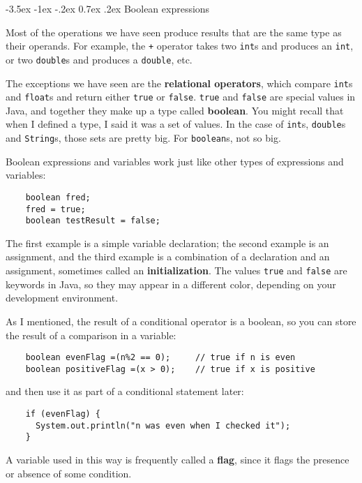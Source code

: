 \documentclass{book}
\makeatletter
\renewcommand{\section}{\@startsection 
    {section} {1} {0mm}%
    {-3.5ex \@plus -1ex \@minus -.2ex}%
    {0.7ex \@plus.2ex}%
    {\normalfont\Large\bfseries}}
\makeatother
\begin{document}
\section{Boolean expressions}

Most of the operations we have seen produce results that are
the same type as their operands.  For example, the {\tt +} operator
takes two {\tt int}s and produces an {\tt int}, or two {\tt double}s
and produces a {\tt double}, etc.


The exceptions we have seen are the {\bf relational operators}, which
compare {\tt int}s and {\tt float}s and return either {\tt true} or
{\tt false}.  {\tt true} and {\tt false} are special values in Java,
and together they make up a type called {\bf boolean}.  You might
recall that when I defined a type, I said it was a set of values.  In
the case of {\tt int}s, {\tt double}s and {\tt String}s, those sets
are pretty big.  For {\tt boolean}s, not so big.

Boolean expressions and variables work just like other types of
expressions and variables:

\begin{verbatim}
    boolean fred;
    fred = true;
    boolean testResult = false;
\end{verbatim}
%
The first example is a simple variable declaration;
the second example is an assignment, and the third example is a
combination of a declaration and an assignment, sometimes
called an {\bf initialization}.  The values {\tt true} and {\tt false}
are keywords in Java, so they may appear in a different color,
depending on your development environment.


As I mentioned, the result of a conditional operator is a boolean,
so you can store the result of a comparison in a variable:

\begin{verbatim}
    boolean evenFlag =(n%2 == 0);     // true if n is even
    boolean positiveFlag =(x > 0);    // true if x is positive
\end{verbatim}
%
and then use it as part of a conditional statement later:

\begin{verbatim}
    if (evenFlag) {
      System.out.println("n was even when I checked it");
    }
\end{verbatim}
%
A variable used in this way is frequently called a {\bf flag},
since it flags the presence or absence of some condition.
\end{document}
